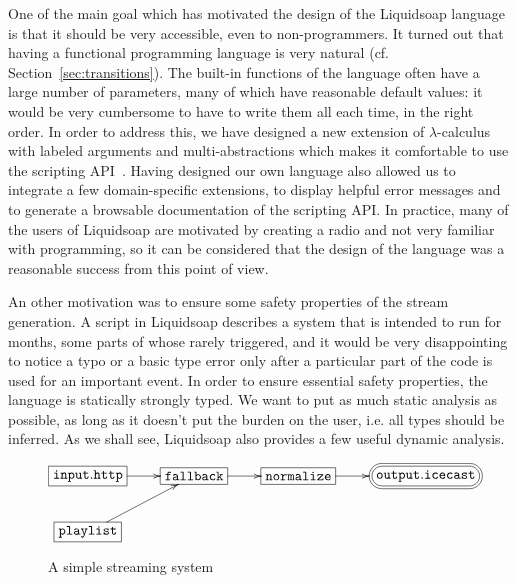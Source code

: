 \documentclass{llncs}
\newcommand{\liquidsoap}{Liquidsoap}
\newcommand{\ie}{{i.e.}}
\newcommand{\cf}{{cf.~}}
\newcommand{\fcaption}[1]{\vspace{-3ex}\caption{#1}\vspace{-4ex}}
\begin{document}
One of the main goal which has motivated the design of the \liquidsoap{}
language is that it should be very accessible, even to non-programmers. It
turned out that having a functional programming language is very natural (\cf
Section~\ref{sec:transitions}). The built-in functions of the language often
have a large number of parameters, many of which have reasonable default values:
it would be very cumbersome to have to write them all each time, in the right
order. In order to address this, we have designed a new extension of
$\lambda$-calculus with labeled arguments and multi-abstractions which makes it
comfortable to use the scripting
API~\cite{baelde-mimram:webradio-lambda}. Having designed our own language also
allowed us to integrate a few domain-specific extensions, to display helpful
error messages and to generate a browsable documentation of the scripting API. In
practice, many of the users of \liquidsoap{} are motivated by creating a radio
and not very familiar with programming, so it can be considered that the design of
the language was a reasonable success from this point of view.

An other motivation was to ensure some safety properties of the stream
generation. A script in \liquidsoap{} describes a system that is intended to run
for months, some parts of whose rarely triggered, and it would be very
disappointing to notice a typo or a basic type error only after a particular
part of the code is used for an important event. In order to ensure essential
safety properties, the language is statically strongly typed. We want to put as
much static analysis as possible, as long as it doesn't put the burden on the
user, \ie{} all types should be inferred. As we shall see, \liquidsoap{} also
provides a few useful dynamic analysis.

\begin{figure}[t]
 \begin{center}
\[
\xymatrix{
  *+[F]{\mathtt{input.http}}\ar[r]&*+[F]{\mathtt{fallback}}\ar[r]&
  *+[F]{\mathtt{normalize}}\ar[r]&
  *+<10pt>[F=:<30pt>]{\mathtt{output.icecast}}\\
  *+[F]{\mathtt{playlist}}\ar[ur]&\\
}
\]
\end{center}
 \fcaption{A simple streaming system}
 \label{fig:simple}
\end{figure}
\end{document}

